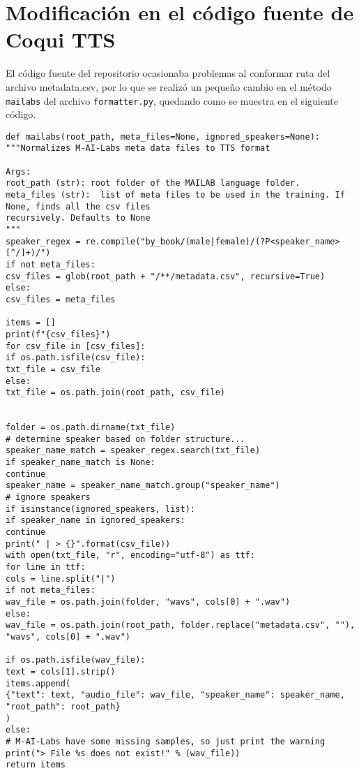 \section{Modificación en el código fuente de Coqui TTS} \label{mailabs}
El código fuente del repositorio ocasionaba problemas al conformar ruta del archivo metadata.csv, por lo que se realizó un pequeño cambio en el método \texttt{mailabs} del archivo \texttt{formatter.py}, quedando como se muestra en el siguiente código.


\lstset{language=Python}
\lstset{frame=lines}
\lstset{basicstyle=\footnotesize}
\begin{lstlisting}
def mailabs(root_path, meta_files=None, ignored_speakers=None):
"""Normalizes M-AI-Labs meta data files to TTS format

Args:
root_path (str): root folder of the MAILAB language folder.
meta_files (str):  list of meta files to be used in the training. If None, finds all the csv files
recursively. Defaults to None
"""
speaker_regex = re.compile("by_book/(male|female)/(?P<speaker_name>[^/]+)/")
if not meta_files:
csv_files = glob(root_path + "/**/metadata.csv", recursive=True)
else:
csv_files = meta_files

items = []
print(f"{csv_files}")
for csv_file in [csv_files]:
if os.path.isfile(csv_file):
txt_file = csv_file
else:
txt_file = os.path.join(root_path, csv_file)


folder = os.path.dirname(txt_file)
# determine speaker based on folder structure...
speaker_name_match = speaker_regex.search(txt_file)
if speaker_name_match is None:
continue
speaker_name = speaker_name_match.group("speaker_name")
# ignore speakers
if isinstance(ignored_speakers, list):
if speaker_name in ignored_speakers:
continue
print(" | > {}".format(csv_file))
with open(txt_file, "r", encoding="utf-8") as ttf:
for line in ttf:
cols = line.split("|")
if not meta_files:
wav_file = os.path.join(folder, "wavs", cols[0] + ".wav")
else:
wav_file = os.path.join(root_path, folder.replace("metadata.csv", ""), "wavs", cols[0] + ".wav")

if os.path.isfile(wav_file):
text = cols[1].strip()
items.append(
{"text": text, "audio_file": wav_file, "speaker_name": speaker_name, "root_path": root_path}
)
else:
# M-AI-Labs have some missing samples, so just print the warning
print("> File %s does not exist!" % (wav_file))
return items
\end{lstlisting}

